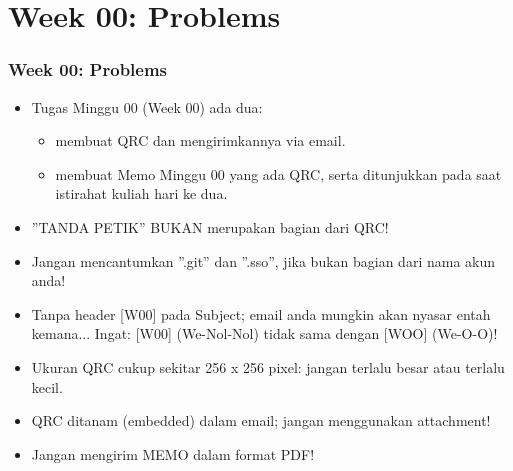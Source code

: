 \documentclass[xcolor=table, notheorems, hyperref={pdfpagelabels=false}]{beamer}
\begin{document}
\section{Week 00: Problems}
\begin{frame}
\frametitle{Week 00: Problems}
\begin{itemize}
\item Tugas Minggu 00 (Week 00) ada dua:
\begin{itemize}
\item membuat QRC dan mengirimkannya via email.
\item membuat Memo Minggu 00 yang ada QRC, serta ditunjukkan pada saat istirahat kuliah hari ke dua.
\end{itemize}
\item ''TANDA PETIK'' BUKAN merupakan bagian dari QRC!
\item Jangan mencantumkan ''.git'' dan ''.sso'', jika bukan bagian dari nama akun anda!
\item Tanpa header [W00] pada Subject; email anda mungkin akan nyasar entah kemana...
      Ingat: [W00] (We-Nol-Nol) tidak sama dengan [WOO] (We-O-O)!
\item Ukuran QRC cukup sekitar 256 x 256 pixel: jangan terlalu besar atau terlalu kecil.
\item QRC ditanam (embedded) dalam email; jangan menggunakan attachment!
\item Jangan mengirim MEMO dalam format PDF!
\end{itemize}
\end{frame}

\end{document}
